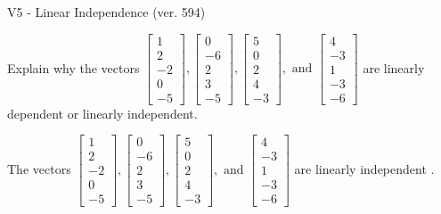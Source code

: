 \begin{exercise}
  \begin{exerciseTitle}V5 - Linear Independence (ver. 594)\end{exerciseTitle}
  \begin{exerciseStatement}
    Explain why the vectors \(\left[\begin{array}{r}
1 \\
2 \\
-2 \\
0 \\
-5
\end{array}\right] , \left[\begin{array}{r}
0 \\
-6 \\
2 \\
3 \\
-5
\end{array}\right] , \left[\begin{array}{r}
5 \\
0 \\
2 \\
4 \\
-3
\end{array}\right] , \text{ and } \left[\begin{array}{r}
4 \\
-3 \\
1 \\
-3 \\
-6
\end{array}\right]\) are linearly dependent or linearly independent.	


  \end{exerciseStatement}
  \begin{exerciseAnswer}
   The vectors \(\left[\begin{array}{r}
1 \\
2 \\
-2 \\
0 \\
-5
\end{array}\right] , \left[\begin{array}{r}
0 \\
-6 \\
2 \\
3 \\
-5
\end{array}\right] , \left[\begin{array}{r}
5 \\
0 \\
2 \\
4 \\
-3
\end{array}\right] , \text{ and } \left[\begin{array}{r}
4 \\
-3 \\
1 \\
-3 \\
-6
\end{array}\right]\) are 
  	 linearly independent  .
  


  \end{exerciseAnswer}
\end{exercise}